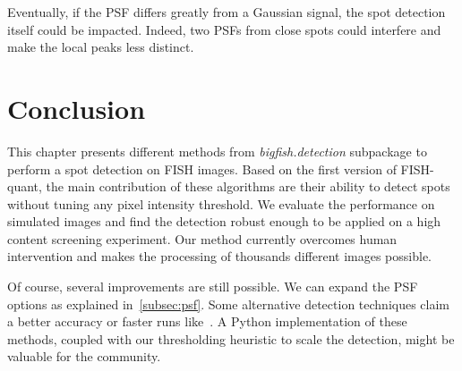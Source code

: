 Eventually, if the \ac{PSF} differs greatly from a Gaussian signal, the spot detection itself could be impacted.
Indeed, two \ac{PSF}s from close spots could interfere and make the local peaks less distinct.


\section{Conclusion} \label{sec:detection_conclusion}

This chapter presents different methods from \emph{bigfish.detection} subpackage to perform a spot detection on \ac{FISH} images.
Based on the first version of FISH-quant, the main contribution of these algorithms are their ability to detect spots without tuning any pixel intensity threshold.
We evaluate the performance on simulated images and find the detection robust enough to be applied on a high content screening experiment.
Our method currently overcomes human intervention and makes the processing of thousands different images possible.

Of course, several improvements are still possible.
We can expand the \ac{PSF} options as explained in~\ref{subsec:psf}.
Some alternative detection techniques claim a better accuracy or faster runs like~\cite{bahry_rs-fish_2021}.
A Python implementation of these methods, coupled with our thresholding heuristic to scale the detection, might be valuable for the community.

